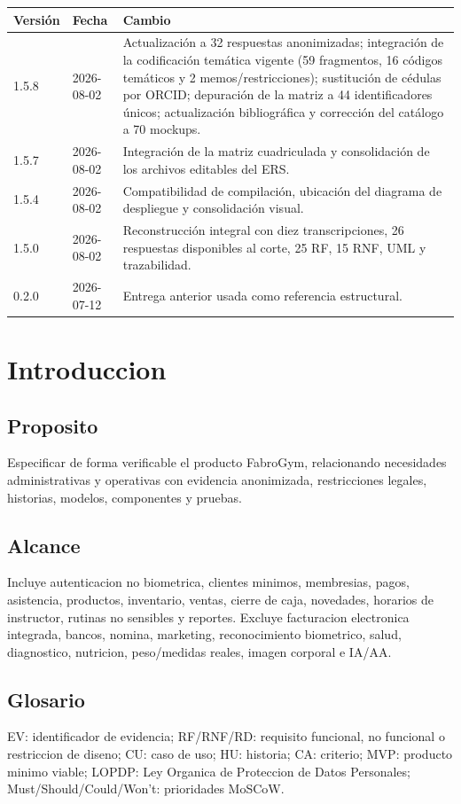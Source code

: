 \documentclass[11pt,a4paper,twoside]{article}
\begin{document}
\begin{tabularx}{\textwidth}{p{2.2cm}p{2.4cm}X}
\toprule Versión & Fecha & Cambio \\ \midrule
1.5.8 & 2026-08-02 & Actualización a 32 respuestas anonimizadas; integración de la codificación temática vigente (59 fragmentos, 16 códigos temáticos y 2 memos/restricciones); sustitución de cédulas por ORCID; depuración de la matriz a 44 identificadores únicos; actualización bibliográfica y corrección del catálogo a 70 mockups. \\
1.5.7 & 2026-08-02 & Integración de la matriz cuadriculada y consolidación de los archivos editables del ERS. \\
1.5.4 & 2026-08-02 & Compatibilidad de compilación, ubicación del diagrama de despliegue y consolidación visual. \\
1.5.0 & 2026-08-02 & Reconstrucción integral con diez transcripciones, 26 respuestas disponibles al corte, 25 RF, 15 RNF, UML y trazabilidad. \\
0.2.0 & 2026-07-12 & Entrega anterior usada como referencia estructural. \\
\bottomrule
\end{tabularx}

\section{Introduccion}
\subsection{Proposito}
Especificar de forma verificable el producto FabroGym, relacionando necesidades administrativas y operativas con evidencia anonimizada, restricciones legales, historias, modelos, componentes y pruebas.
\subsection{Alcance}
Incluye autenticacion no biometrica, clientes minimos, membresias, pagos, asistencia, productos, inventario, ventas, cierre de caja, novedades, horarios de instructor, rutinas no sensibles y reportes. Excluye facturacion electronica integrada, bancos, nomina, marketing, reconocimiento biometrico, salud, diagnostico, nutricion, peso/medidas reales, imagen corporal e IA/AA.
\subsection{Glosario}
EV: identificador de evidencia; RF/RNF/RD: requisito funcional, no funcional o restriccion de diseno; CU: caso de uso; HU: historia; CA: criterio; MVP: producto minimo viable; LOPDP: Ley Organica de Proteccion de Datos Personales; Must/Should/Could/Won't: prioridades MoSCoW.
\end{document}
